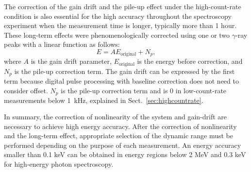 The correction of the gain drift and the pile-up effect under the high-count-rate condition is also essential for the high accuracy throughout the spectroscopy experiment when the measurement time is longer, typically more than 1 hour.
These long-term effects were phenomenologically corrected using one or two $\gamma$-ray peaks with a linear function as follows:
\begin{equation}
  \label{eq:gain_drift}
  E = A E_\mathrm{original} + N_p,
\end{equation}
where $A$ is the gain drift parameter, $E_\mathrm{original}$ is the energy before correction, and $N_p$ is the pile-up correction term.
The gain drift can be expressed by the first term %
because digital pulse processing with baseline correction does not need to consider offset. 
$N_p$ is the pile-up correction term and is 0 in low-count-rate measurements below 1~kHz, 
explained in Sect.~\ref{sec:highcountrate}. 

In summary, the correction of nonlinearity of the system and gain-drift are necessary to achieve high energy accuracy.
After the correction of nonlinearity and the long-term effect, appropriate selection of the dynamic range must be performed depending on the purpose of each measurement.
An energy accuracy smaller than 0.1 keV can be obtained in energy regions below 2 MeV and 0.3 keV for high-energy photon spectroscopy.
